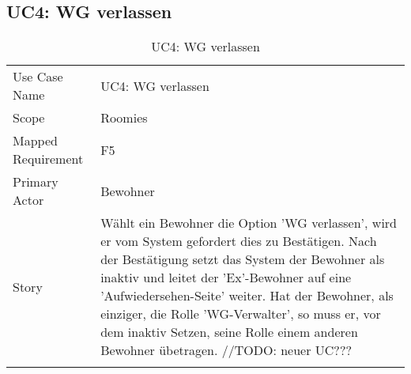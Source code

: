 \subsection{UC4: WG verlassen}
\begin{table}[H]
	\tablestyle
	\tablealtcolored
	\begin{tabularx}{\textwidth}{lX}
		\tablebody
			Use Case Name &
			UC4: WG verlassen
			\tabularnewline
			Scope &
			Roomies
			\tabularnewline
			Mapped Requirement &
			F5
			\tabularnewline
			Primary Actor &
			Bewohner
			\tabularnewline
			Story &
			Wählt ein Bewohner die Option 'WG verlassen', wird er vom System gefordert dies zu Bestätigen. Nach der Bestätigung setzt das System der Bewohner als inaktiv und leitet der 'Ex'-Bewohner auf eine 'Aufwiedersehen-Seite' weiter. \newline
			Hat der Bewohner, als einziger, die Rolle 'WG-Verwalter', so muss er, vor dem inaktiv Setzen, seine Rolle einem anderen Bewohner übetragen. \newline//TODO: neuer UC???
			\tabularnewline
		\tableend
	\end{tabularx}
	\caption{UC4: WG verlassen}
\end{table}


